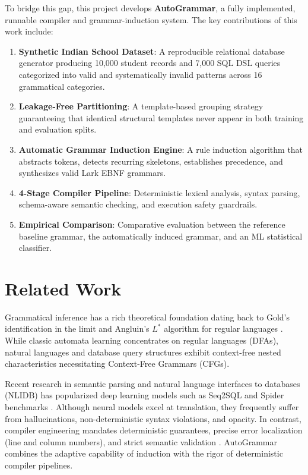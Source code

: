 \documentclass[11pt,a4paper]{article}
\begin{document}
To bridge this gap, this project develops \textbf{AutoGrammar}, a fully implemented, runnable compiler and grammar-induction system. The key contributions of this work include:
\begin{enumerate}
    \item \textbf{Synthetic Indian School Dataset}: A reproducible relational database generator producing 10,000 student records and 7,000 SQL DSL queries categorized into valid and systematically invalid patterns across 16 grammatical categories.
    \item \textbf{Leakage-Free Partitioning}: A template-based grouping strategy guaranteeing that identical structural templates never appear in both training and evaluation splits.
    \item \textbf{Automatic Grammar Induction Engine}: A rule induction algorithm that abstracts tokens, detects recurring skeletons, establishes precedence, and synthesizes valid Lark EBNF grammars.
    \item \textbf{4-Stage Compiler Pipeline}: Deterministic lexical analysis, syntax parsing, schema-aware semantic checking, and execution safety guardrails.
    \item \textbf{Empirical Comparison}: Comparative evaluation between the reference baseline grammar, the automatically induced grammar, and an ML statistical classifier.
\end{enumerate}

\section{Related Work}
Grammatical inference has a rich theoretical foundation dating back to Gold's identification in the limit and Angluin's $L^*$ algorithm for regular languages \cite{angluin1987learning, degroote2010grammatical}. While classic automata learning concentrates on regular languages (DFAs), natural languages and database query structures exhibit context-free nested characteristics necessitating Context-Free Grammars (CFGs).

Recent research in semantic parsing and natural language interfaces to databases (NLIDB) has popularized deep learning models such as Seq2SQL \cite{zhong2017seq2sql} and Spider benchmarks \cite{yu2018spider}. Although neural models excel at translation, they frequently suffer from hallucinations, non-deterministic syntax violations, and opacity. In contrast, compiler engineering mandates deterministic guarantees, precise error localization (line and column numbers), and strict semantic validation \cite{aho2006compilers}. AutoGrammar combines the adaptive capability of induction with the rigor of deterministic compiler pipelines.
\end{document}
